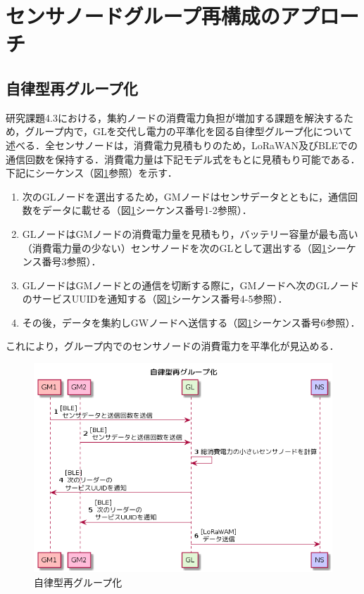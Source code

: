 \section{センサノードグループ再構成のアプローチ}

\subsection{自律型再グループ化}
研究課題4.3における，集約ノードの消費電力負担が増加する課題を解決するため，グループ内で，GLを交代し電力の平準化を図る自律型グループ化について述べる．全センサノードは，消費電力見積もりのため，LoRaWAN及びBLEでの通信回数を保持する．消費電力量は下記モデル式をもとに見積もり可能である．下記にシーケンス（図\ref{fig:group_reconstruction_independently}参照）を示す．

\begin{enumerate}
    \item 次のGLノードを選出するため，GMノードはセンサデータとともに，通信回数をデータに載せる（図\ref{fig:group_reconstruction_independently}シーケンス番号1-2参照）．
    \item GLノードはGMノードの消費電力量を見積もり，バッテリー容量が最も高い（消費電力量の少ない）センサノードを次のGLとして選出する（図\ref{fig:group_reconstruction_independently}シーケンス番号3参照）．
    \item GLノードはGMノードとの通信を切断する際に，GMノードへ次のGLノードのサービスUUIDを通知する（図\ref{fig:group_reconstruction_independently}シーケンス番号4-5参照）．
    \item その後，データを集約しGWノードへ送信する（図\ref{fig:group_reconstruction_independently}シーケンス番号6参照）．
\end{enumerate}

これにより，グループ内でのセンサノードの消費電力を平準化が見込める．

\begin{figure}[]
    \begin{center}
    \includegraphics[width=14cm]{figures/v2.0/自律型再グループ化.png}
    \caption{自律型再グループ化}
    \label{fig:group_reconstruction_independently}
    \end{center}
\end{figure}

